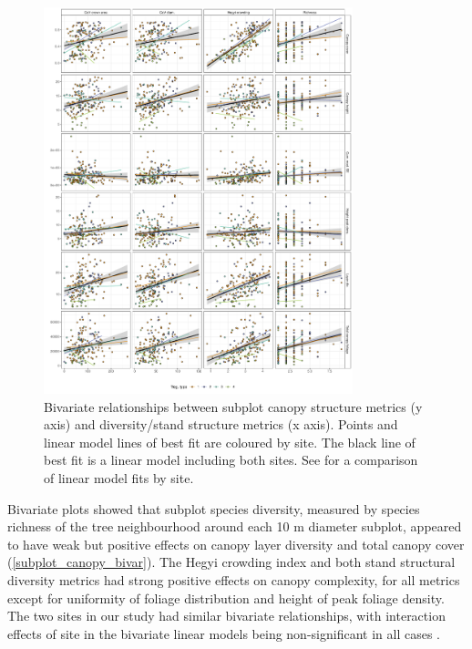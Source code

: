 \documentclass[11pt,a4paper]{article}
\begin{document}
\begin{figure}[H]
	\includegraphics[width=0.8\textwidth]{subplot_canopy_bivar}
	\caption{Bivariate relationships between subplot canopy structure metrics (y axis) and diversity/stand structure metrics (x axis). Points and linear model lines of best fit are coloured by site. The black line of best fit is a linear model including both sites. See  for a comparison of linear model fits by site.}
	\label{subplot_canopy_bivar}
\end{figure}


Bivariate plots showed that subplot species diversity, measured by species richness of the tree neighbourhood around each 10 m diameter subplot, appeared to have weak but positive effects on canopy layer diversity and total canopy cover (\autoref{subplot_canopy_bivar}). The Hegyi crowding index and both stand structural diversity metrics had strong positive effects on canopy complexity, for all metrics except for uniformity of foliage distribution and height of peak foliage density. The two sites in our study had similar bivariate relationships, with interaction effects of site in the bivariate linear models being non-significant in all cases .
\end{document}
